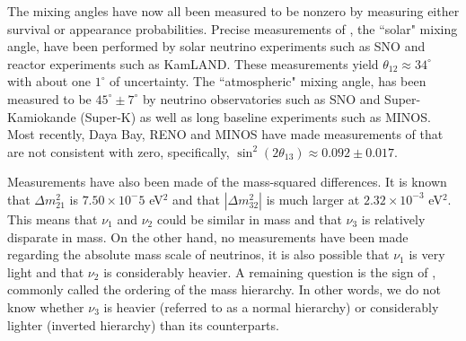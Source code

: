 The mixing angles have now all been measured to be nonzero by measuring either survival or appearance probabilities.  Precise measurements of \thetaot, the ``solar" mixing angle, have been performed by solar neutrino experiments such as SNO and reactor experiments such as KamLAND.\cite{sno, kamland, pdg}  These measurements yield $\theta_{12} \approx 34^\circ$ with about one $1^\circ$ of uncertainty.  The ``atmospheric" mixing angle, \thetatth has been measured to be $45^\circ \pm 7^\circ$ by neutrino observatories such as SNO and Super-Kamiokande (Super-K) as well as long baseline experiments such as MINOS.\cite{sno, superK, minos, pdg}  Most recently, Daya Bay, RENO and MINOS have made measurements of \thetaoth that are not consistent with zero, specifically, $\sin^2(2 \theta_{13}) \approx 0.092 \pm 0.017$. \cite{dayaBay, reno, minos13}

Measurements have also been made of the mass-squared differences.  It is known that $\Delta m_{21}^2$ is $7.50 \times 10^-5$ eV${}^2$ and that $|\Delta m_{32}^2|$ is much larger at $2.32\times10^{-3}$ eV${^2}$.  This means that $\nu_1$ and $\nu_2$ could be similar in mass and that $\nu_3$ is relatively disparate in mass.  On the other hand, no measurements have been made regarding the absolute mass scale of neutrinos, it is also possible that $\nu_1$ is very light and that $\nu_2$ is considerably heavier.  A remaining question is the sign of \deltamtht, commonly called the ordering of the mass hierarchy.  In other words, we do not know whether $\nu_3$ is heavier (referred to as a normal hierarchy) or considerably lighter (inverted hierarchy) than its counterparts.  

